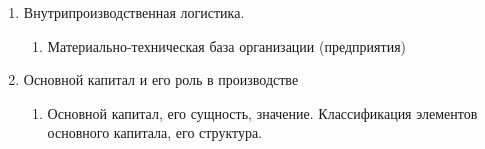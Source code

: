 \documentclass[a4paper,landscape]{article}
\begin{document}
\begin{multicols}{2}
\begin{enumerate}
\begin{enumerate}
        \item Внутрипроизводственная логистика.
        \begin{enumerate}
            \item Материально-техническая база организации (предприятия)
        \end{enumerate}
        \item Основной капитал и его роль в производстве
        \begin{enumerate}
            \item Основной капитал, его сущность, значение. Классификация элементов основного капитала, его структура.
        \end{enumerate}
    \end{enumerate}
\end{enumerate}
\end{multicols}
\end{document}
